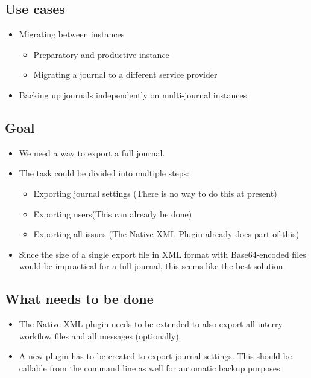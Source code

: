 \documentclass{article}
\begin{document}
\subsection[{Use cases}]{\label{n9obwgh5nm6w}Use cases}
\begin{itemize}
\item Migrating between instances 
\begin{itemize}
\item Preparatory and productive instance
\item Migrating a journal to a different service provider
\end{itemize} 
\item Backing up journals independently on multi-journal instances
\end{itemize} 

\subsection[{Goal}]{\label{e4lpz19m7e47}Goal}
\begin{itemize}
\item We need a way to export a full journal. 
\item The task could be divided into multiple steps:
\begin{itemize}
\item Exporting journal settings (There is no way to do this at present)
\item Exporting users(This can already be done)
\item Exporting all issues (The Native XML Plugin already does part of this)
\end{itemize} 
\item Since the size of a single export file in XML format with Base64-encoded files would be impractical for a full journal, this seems like the best solution.
\end{itemize} 
\subsection[{What needs to be done}]{\label{56w7y5hscs4v}What needs to be done}
\begin{itemize}
\item The Native XML plugin needs to be extended to also export all interry workflow files and all messages (optionally).
\item A new plugin has to be created to export journal settings. This should be callable from the command line as well for automatic backup purposes.
\end{itemize} 
\end{document}
